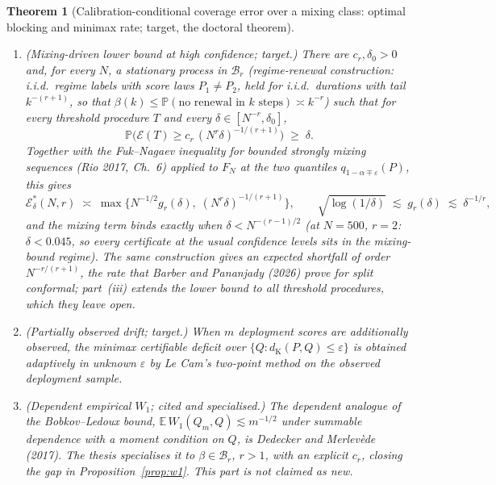 \documentclass[11pt,a4paper]{article}
\newcommand{\target}{{\color{teal}\textsf{\small target}}}
\theoremstyle{plain}
\newtheorem{theorem}{Theorem}
\theoremstyle{definition}
\theoremstyle{remark}
\newcommand{\E}{\mathbb{E}}
\newcommand{\Prob}{\mathbb{P}}
\newcommand{\dK}{d_{\mathrm{K}}}
\begin{document}
\begin{theorem}[Calibration-conditional coverage error over a mixing class: optimal blocking and minimax rate; \target, the doctoral theorem]
\begin{enumerate}[nosep,label=(\roman*)]
\[\]
I.i.d.\ scores lie in every $\mathcal B_r$, and the two-point argument for them gives $\mathcal E^*_\delta(N,r)\ge c_\delta N^{-1/2}$. At fixed $\delta$ the minimax rate over $\mathcal B_r$ is therefore exactly $N^{-1/2}$, attained without blocking; the blocked rate $N^{-r/(2r+3)}$ of (i) is slower by the factor $\sqrt{b^*}$. Blocking buys the exact Beta law and a certificate whose only dependence on $(C,r)$ is the failure probability $(n+1)\beta(b)$; it does not buy rate.
\item (Mixing-driven lower bound at high confidence; \target.) There are $c_r,\delta_0>0$ and, for every $N$, a stationary process in $\mathcal B_r$ (regime-renewal construction: i.i.d.\ regime labels with score laws $P_1\ne P_2$, held for i.i.d.\ durations with tail $k^{-(r+1)}$, so that $\beta(k)\le\Prob(\text{no renewal in }k\text{ steps})\asymp k^{-r}$) such that for every threshold procedure $T$ and every $\delta\in[N^{-r},\delta_0]$,
\[
\Prob\big(\mathcal E(T)\ge c_r\,(N^{r}\delta)^{-1/(r+1)}\big)\;\ge\;\delta .
\]
Together with the Fuk--Nagaev inequality for bounded strongly mixing sequences (Rio 2017, Ch.~6) applied to $F_N$ at the two quantiles $q_{1-\alpha\mp\varepsilon}(P)$, this gives
\[
\mathcal E^*_\delta(N,r)\;\asymp\;\max\Big\{N^{-1/2}g_r(\delta),\;(N^{r}\delta)^{-1/(r+1)}\Big\},\qquad \sqrt{\log(1/\delta)}\;\lesssim\;g_r(\delta)\;\lesssim\;\delta^{-1/r},
\]
and the mixing term binds exactly when $\delta<N^{-(r-1)/2}$ (at $N=500$, $r=2$: $\delta<0.045$, so every certificate at the usual confidence levels sits in the mixing-bound regime). The same construction gives an expected shortfall of order $N^{-r/(r+1)}$, the rate that Barber and Pananjady (2026) prove for split conformal; part~(iii) extends the lower bound to all threshold procedures, which they leave open.
\item (Partially observed drift; \target.) When $m$ deployment scores are additionally observed, the minimax certifiable deficit over $\{Q:\dK(P,Q)\le\varepsilon\}$ is obtained adaptively in unknown $\varepsilon$ by Le Cam's two-point method on the observed deployment sample.
\item (Dependent empirical $W_1$; cited and specialised.) The dependent analogue of the Bobkov--Ledoux bound, $\E\,W_1(Q_m,Q)\lesssim m^{-1/2}$ under summable dependence with a moment condition on $Q$, is Dedecker and Merlev\`ede (2017). The thesis specialises it to $\beta\in\mathcal B_r$, $r>1$, with an explicit $c_r$, closing the gap in Proposition~\ref{prop:w1}. This part is not claimed as new.
\end{enumerate}
\end{theorem}
\end{document}
